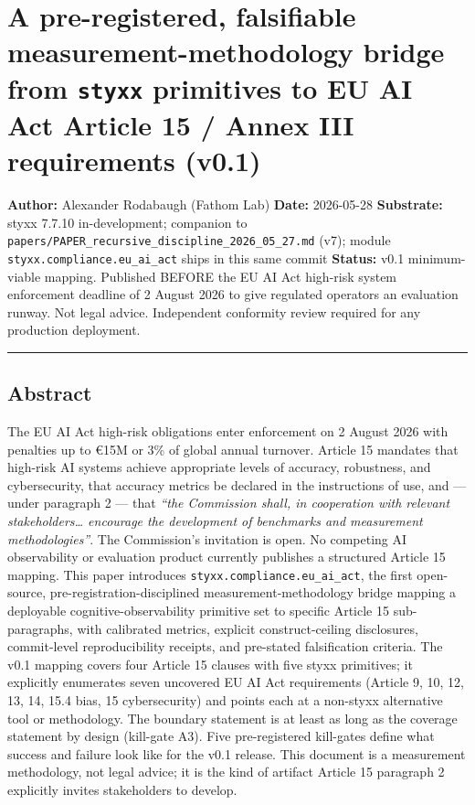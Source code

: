 \documentclass[
]{article}
\author{}
\date{}
\begin{document}
\section{\texorpdfstring{A pre-registered, falsifiable
measurement-methodology bridge from \texttt{styxx} primitives to EU AI
Act Article 15 / Annex III requirements
(v0.1)}{A pre-registered, falsifiable measurement-methodology bridge from styxx primitives to EU AI Act Article 15 / Annex III requirements (v0.1)}}\label{a-pre-registered-falsifiable-measurement-methodology-bridge-from-styxx-primitives-to-eu-ai-act-article-15-annex-iii-requirements-v0.1}

\textbf{Author:} Alexander Rodabaugh (Fathom Lab) \textbf{Date:}
2026-05-28 \textbf{Substrate:} styxx 7.7.10 in-development; companion to
\texttt{papers/PAPER\_recursive\_discipline\_2026\_05\_27.md} (v7);
module \texttt{styxx.compliance.eu\_ai\_act} ships in this same commit
\textbf{Status:} v0.1 minimum-viable mapping. Published BEFORE the EU AI
Act high-risk system enforcement deadline of 2 August 2026 to give
regulated operators an evaluation runway. Not legal advice. Independent
conformity review required for any production deployment.

\begin{center}\rule{0.5\linewidth}{0.5pt}\end{center}

\subsection{Abstract}\label{abstract}

The EU AI Act high-risk obligations enter enforcement on 2 August 2026
with penalties up to €15M or 3\% of global annual turnover. Article 15
mandates that high-risk AI systems achieve appropriate levels of
accuracy, robustness, and cybersecurity, that accuracy metrics be
declared in the instructions of use, and --- under paragraph 2 --- that
\emph{``the Commission shall, in cooperation with relevant
stakeholders\ldots{} encourage the development of benchmarks and
measurement methodologies''}. The Commission's invitation is open. No
competing AI observability or evaluation product currently publishes a
structured Article 15 mapping. This paper introduces
\texttt{styxx.compliance.eu\_ai\_act}, the first open-source,
pre-registration-disciplined measurement-methodology bridge mapping a
deployable cognitive-observability primitive set to specific Article 15
sub-paragraphs, with calibrated metrics, explicit construct-ceiling
disclosures, commit-level reproducibility receipts, and pre-stated
falsification criteria. The v0.1 mapping covers four Article 15 clauses
with five styxx primitives; it explicitly enumerates seven uncovered EU
AI Act requirements (Article 9, 10, 12, 13, 14, 15.4 bias, 15
cybersecurity) and points each at a non-styxx alternative tool or
methodology. The boundary statement is at least as long as the coverage
statement by design (kill-gate A3). Five pre-registered kill-gates
define what success and failure look like for the v0.1 release. This
document is a measurement methodology, not legal advice; it is the kind
of artifact Article 15 paragraph 2 explicitly invites stakeholders to
develop.
\end{document}
